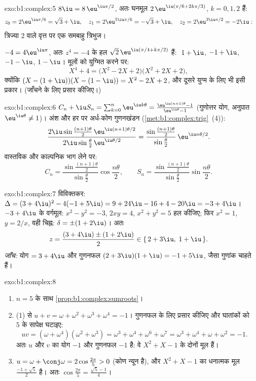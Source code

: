 \begin{solution}{exo:b1:complex:5}
$8\iu = 8\,\eu^{\iu\pi/2}$, अतः घनमूल $2\,\eu^{\iu(\pi/6 + 2k\pi/3)}$, $k =
0, 1, 2$ हैं:
\[
z_0 = 2\eu^{\iu\pi/6} = \sqrt 3 + \iu,\quad
z_1 = 2\eu^{5\iu\pi/6} = -\sqrt 3 + \iu,\quad
z_2 = 2\eu^{3\iu\pi/2} = -2\iu :
\]
त्रिज्या $2$ वाले वृत्त पर एक समबाहु त्रिभुज।

$-4 = 4\eu^{\iu\pi}$, अतः $z^4 = -4$ के हल $\sqrt 2\, \eu^{\iu(\pi/4 +
k\pi/2)}$ हैं: $\;1 + \iu$, $-1 + \iu$, $-1 - \iu$, $1 - \iu$। 
मूलों को युग्मित करने पर:
\[
X^4 + 4 = \bigl(X^2 - 2X + 2\bigr)\bigl(X^2 + 2X + 2\bigr),
\]
क्योंकि $(X - (1+\iu))(X - (1-\iu)) = X^2 - 2X + 2$, और दूसरे युग्म के लिए
भी इसी प्रकार। (जाँचने के लिए प्रसार कीजिए।)
\end{solution}

\begin{solution}{exo:b1:complex:6}
$C_n + \iu S_n = \sum_{k=0}^{n} \eu^{\iu k\theta} =
\frac{\eu^{\iu(n+1)\theta} - 1}{\eu^{\iu\theta} - 1}$ (गुणोत्तर योग, अनुपात
$\eu^{\iu\theta} \neq 1$)। अंश और हर पर अर्ध-कोण गुणनखंडन
(\cref{met:b1:complex:trig}~(4)):
\[
\frac{2\iu\sin\frac{(n+1)\theta}{2}\, \eu^{\iu(n+1)\theta/2}}
{2\iu\sin\frac{\theta}{2}\, \eu^{\iu\theta/2}}
= \frac{\sin\frac{(n+1)\theta}{2}}{\sin\frac{\theta}{2}}\,
\eu^{\iu n\theta/2}.
\]
वास्तविक और काल्पनिक भाग लेने पर:
\[
C_n = \frac{\sin\frac{(n+1)\theta}{2}}{\sin\frac{\theta}{2}}
\cos\frac{n\theta}{2},
\qquad
S_n = \frac{\sin\frac{(n+1)\theta}{2}}{\sin\frac{\theta}{2}}
\sin\frac{n\theta}{2}.
\]
\end{solution}

\begin{solution}{exo:b1:complex:7}
विविक्तकर: $\Delta = (3 + 4\iu)^2 - 4(-1 + 5\iu) = 9 + 24\iu - 16 + 4 -
20\iu = -3 + 4\iu$। $-3 + 4\iu$ के वर्गमूल: $x^2 - y^2 = -3$, $2xy = 4$,
$x^2 + y^2 = 5$ हल कीजिए; फिर $x^2 = 1$, $y = 2/x$, वही चिह्न: $\delta =
\pm(1 + 2\iu)$। अतः
\[
z = \frac{(3 + 4\iu) \pm (1 + 2\iu)}{2}
\in \{\, 2 + 3\iu,\; 1 + \iu \,\}.
\]
\emph{जाँच:} योग $= 3 + 4\iu$ और गुणनफल $(2+3\iu)(1+\iu) = -1 + 5\iu$, जैसा
गुणांक चाहते हैं।
\end{solution}

\begin{solution}{exo:b1:complex:8}
\begin{enumerate}
  \item $n = 5$ के साथ \cref{prop:b1:complex:sumroots}।
  \item (1) से $u + v = \omega + \omega^2 + \omega^3 + \omega^4 = -1$।
  गुणनफल के लिए प्रसार कीजिए और घातांकों को $5$ के सापेक्ष घटाइए:
        \[
        uv = (\omega + \omega^4)(\omega^2 + \omega^3)
        = \omega^3 + \omega^4 + \omega^6 + \omega^7
        = \omega^3 + \omega^4 + \omega + \omega^2 = -1 .
        \]
        अतः $u$ और $v$ का योग $-1$ और गुणनफल $-1$ है: वे $X^2 + X - 1$ के
        दोनों मूल हैं।
  \item $u = \omega + \conj\omega = 2\cos\frac{2\pi}{5} > 0$ (कोण न्यून है),
  और $X^2 + X - 1$ का धनात्मक मूल $\frac{-1 + \sqrt 5}{2}$ है। अतः
  $\cos\frac{2\pi}{5} = \frac{\sqrt 5 - 1}{4}$।
\end{enumerate}
\end{solution}

